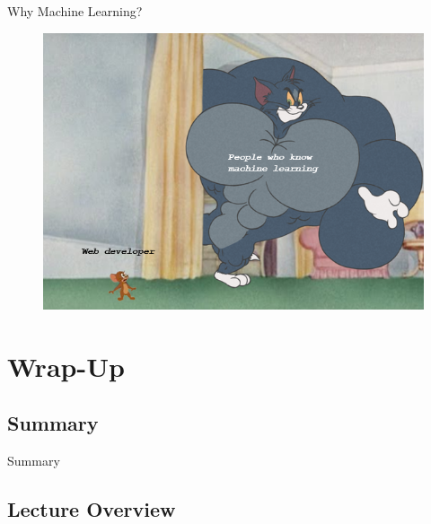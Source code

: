 \begin{frame}{Why Machine Learning?}{}
	\begin{figure}
		\centering
		\includegraphics[scale=0.4]{01_intro_ml/02_img/why_machine_learning}
	\end{figure}
\end{frame}


\section{Wrap-Up}

\subsection{Summary}

\begin{frame}{Summary}{}

\end{frame}


\subsection{Lecture Overview}




